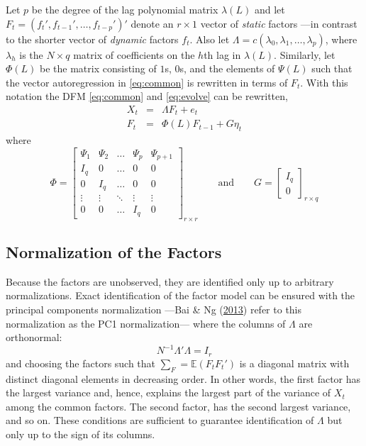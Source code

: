 \documentclass[12pt,twoside]{reedthesis}
\begin{document}
Let \(p\) be the degree of the lag polynomial matrix \(\lambda(L)\) and let \(F_{t} = (f_{t}', f_{t - 1}', \ldots, f_{t - p}')'\) denote an \(r \times 1\) vector of \emph{static} factors ---in contrast to the shorter vector of \emph{dynamic} factors \(f_{t}\). Also let \(\Lambda = c(\lambda_{0}, \lambda_{1}, \ldots, \lambda_{p})\), where \(\lambda_{h}\) is the \(N \times q\) matrix of coefficients on the \(h\)th lag in \(\lambda(L)\). Similarly, let \(\Phi(L)\) be the matrix consisting of \(1\)s, \(0\)s, and the elements of \(\Psi(L)\) such that the vector autoregression in \eqref{eq:common} is rewritten in terms of \(F_{t}\). With this notation the DFM \eqref{eq:common} and \eqref{eq:evolve} can be rewritten,
\begin{eqnarray}
  X_{t} & = & \Lambda F_{t} + e_{t} \label{eq:common-stack}
  \\
  F_{t} & = & \Phi(L) F_{t - 1} + G \eta_{t} \label{eq:evolve-stack} 
\end{eqnarray}
where
\begin{equation*}
  \Phi = 
  \begin{bmatrix}
    \Psi_{1} & \Psi_{2} & \ldots & \Psi_{p} & \Psi_{p + 1} \\
    I_{q} & 0 & \ldots & 0 & 0 \\
    0 & I_{q} & \ldots & 0 & 0 \\
    \vdots & \vdots & \ddots & \vdots & \vdots \\
    0 & 0 & \ldots & I_{q} & 0
  \end{bmatrix}_{r \times r} \qquad
  \text{and} \qquad
  G = 
  \begin{bmatrix}
    I_{q} \\
    0
  \end{bmatrix}_{r \times q}
\end{equation*}
\hypertarget{normalization-of-the-factors}{%
\subsection{Normalization of the Factors}\label{normalization-of-the-factors}}

Because the factors are unobserved, they are identified only up to arbitrary normalizations. Exact identification of the factor model can be ensured with the principal components normalization ---Bai \& Ng (\protect\hyperlink{ref-baing:2013}{2013}) refer to this normalization as the PC1 normalization--- where the columns of \(\Lambda\) are orthonormal:
\begin{equation}
  N^{-1} \Lambda' \Lambda = I_{r} \label{eq:normalization}
\end{equation}
and choosing the factors such that \(\sum_{F} = \mathbb{E}(F_{t}F_{t}')\) is a diagonal matrix with distinct diagonal elements in decreasing order. In other words, the first factor has the largest variance and, hence, explains the largest part of the variance of \(X_{t}\) among the common factors. The second factor, has the second largest variance, and so on. These conditions are sufficient to guarantee identification of \(\Lambda\) but only up to the sign of its columns.
\end{document}

